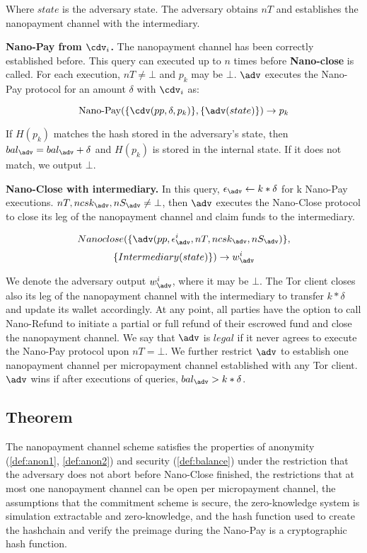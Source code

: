 Where $state$ is the adversary state. The adversary obtains $nT$ and establishes the nanopayment channel with the intermediary.

\textbf{Nano-Pay from $\cdv_i$.} The nanopayment channel has been correctly
established before. This query can executed up to $n$ times before
\textbf{Nano-close} is called. For each execution, $nT \neq \bot$ and $p_k$ may
be $\bot$.  $\adv$ executes the Nano-Pay protocol for an amount $\delta$ with
$\cdv_i$ as:

$$\operatorname{Nano-Pay}(\{\cdv(pp,\delta,p_k)\},\{\adv(state)\}) \rightarrow p_k$$

If $H(p_k)$ matches the hash stored in the adversary's state, then $bal_\adv = bal_\adv+\delta$ and $H(p_k)$ is stored in the internal state. If it does not match, we output $\bot$.

\textbf{Nano-Close with intermediary.} In this query, $\epsilon_\adv \leftarrow k*\delta$ for k Nano-Pay executions. $nT, ncsk_\adv, nS_\adv \neq \bot$, then $\adv$ executes the Nano-Close protocol to close its leg of the nanopayment channel and claim funds to the intermediary.

$$Nano\-close(\{\adv(pp, \epsilon^i_\adv, nT, ncsk_\adv, nS_\adv)\},$$
$$\{Intermediary(state)\}) \rightarrow w^i_\adv$$

We denote the adversary output $w^i_\adv$, where it may be $\bot$. The Tor
client closes also its leg of the nanopayment channel with the intermediary to
transfer $k*\delta$ and update its wallet accordingly. At any point, all parties
have the option to call Nano-Refund to initiate a partial or full refund of
their escrowed fund and close the nanopayment channel. We say that $\adv$ is
$legal$ if it never agrees to execute the Nano-Pay protocol upon $nT = \bot$. We
further restrict $\adv$ to establish one nanopayment channel per micropayment
channel established with any Tor client. $\adv$ wins if after executions of
queries, $bal_\adv > k*\delta$.

\subsection{Theorem}
The nanopayment channel scheme satisfies the properties of anonymity (\ref{def:anon1}, \ref{def:anon2})
 and security (\ref{def:balance}) under the restriction that the adversary does not abort before Nano-Close finished, the restrictions that at most one nanopayment channel can be open per micropayment channel, the assumptions that the commitment scheme is secure, the zero-knowledge system is simulation extractable and zero-knowledge, and the hash function used to create the hashchain and verify the preimage during the Nano-Pay is a cryptographic hash function.

